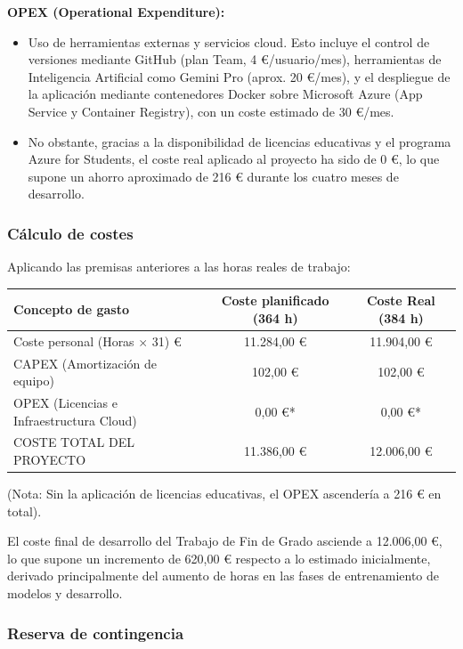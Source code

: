\textbf{OPEX (Operational Expenditure):}
\begin{itemize}
    \item Uso de herramientas externas y servicios cloud. Esto incluye el control de versiones mediante GitHub (plan Team, 4 €/usuario/mes), herramientas de Inteligencia Artificial como Gemini Pro (aprox. 20 €/mes), y el despliegue de la aplicación mediante contenedores Docker sobre Microsoft Azure (App Service y Container Registry), con un coste estimado de 30 €/mes.
    \item No obstante, gracias a la disponibilidad de licencias educativas y el programa Azure for Students, el coste real aplicado al proyecto ha sido de 0 €, lo que supone un ahorro aproximado de 216 € durante los cuatro meses de desarrollo.
\end{itemize}

\subsubsection{Cálculo de costes}

Aplicando las premisas anteriores a las horas reales de trabajo:

\begin{center}
\small
\begin{tabularx}{\textwidth}{Xcc}
\toprule
\textbf{Concepto de gasto} & \textbf{Coste planificado (364 h)} & \textbf{Coste Real (384 h)} \\
\midrule
Coste personal (Horas $\times$ 31) € & 11.284,00 € & 11.904,00 € \\
CAPEX (Amortización de equipo) & 102,00 € & 102,00 € \\
OPEX (Licencias e Infraestructura Cloud) & 0,00 €* & 0,00 €* \\
\midrule
COSTE TOTAL DEL PROYECTO & 11.386,00 € & 12.006,00 € \\
\bottomrule
\end{tabularx}
\end{center}

\noindent (Nota: Sin la aplicación de licencias educativas, el OPEX ascendería a 216 € en total).

El coste final de desarrollo del Trabajo de Fin de Grado asciende a 12.006,00 €, lo que supone un incremento de 620,00 € respecto a lo estimado inicialmente, derivado principalmente del aumento de horas en las fases de entrenamiento de modelos y desarrollo.

\subsubsection{Reserva de contingencia}

